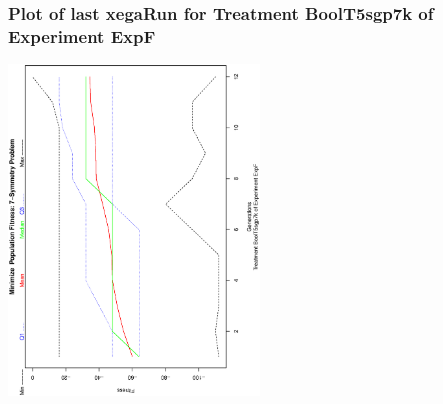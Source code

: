  \begin{frame}
 \frametitle{ Plot of last xegaRun for Treatment BoolT5sgp7k of Experiment ExpF }
 \begin{center}
\includegraphics[width=0.5\textwidth, angle=-90]
{ExpFPlotPopStatsFigure008.eps}
 \end{center}
 \label{report/ExpFPlotPopStatsFigure008.eps}  
 \end{frame}


